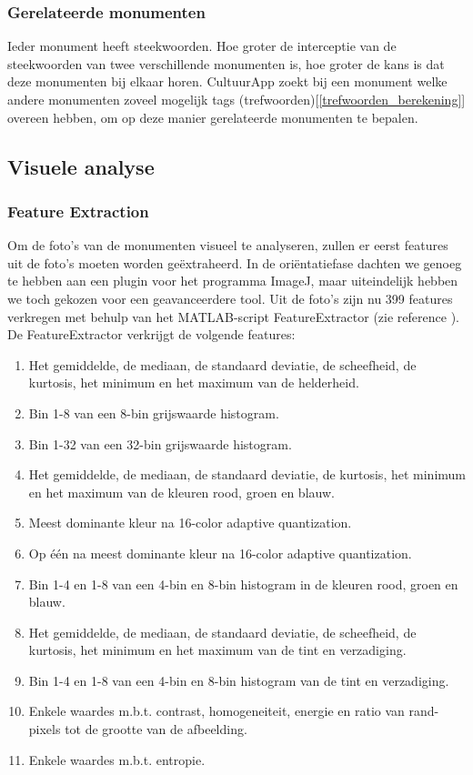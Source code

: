 \documentclass[a4paper,10pt]{article}
\begin{document}
		\subsubsection{Gerelateerde monumenten}
		Ieder monument heeft steekwoorden. Hoe groter de interceptie van de steekwoorden van twee verschillende monumenten is, hoe groter de kans is dat deze monumenten bij elkaar horen. CultuurApp zoekt bij een monument welke andere monumenten zoveel mogelijk tags (trefwoorden)[\ref{trefwoorden_berekening}] overeen hebben, om op deze manier gerelateerde monumenten te bepalen.

	\subsection{Visuele analyse}		
		\subsubsection{Feature Extraction}
		Om de foto's van de monumenten visueel te analyseren, zullen er eerst features uit de foto's moeten worden ge\"extraheerd. In de ori\"entatiefase dachten we genoeg te hebben aan een plugin voor het programma ImageJ, maar uiteindelijk hebben we toch gekozen voor een geavanceerdere tool. Uit de foto's zijn nu 399 features verkregen met behulp van het MATLAB-script FeatureExtractor (zie reference \cite{5}). De FeatureExtractor verkrijgt de volgende features:
		\begin{enumerate}
			\item Het gemiddelde, de mediaan, de standaard deviatie, de scheefheid, de kurtosis, het minimum en het maximum van de helderheid.
			\item Bin 1-8 van een 8-bin grijswaarde histogram.
			\item Bin 1-32 van een 32-bin grijswaarde histogram.
			\item Het gemiddelde, de mediaan, de standaard deviatie, de kurtosis, het minimum en het maximum van de kleuren rood, groen en blauw.
			\item Meest dominante kleur na 16-color adaptive quantization.
			\item Op \'e\'en na meest dominante kleur na 16-color adaptive quantization.
			\item Bin 1-4 en 1-8 van een 4-bin en 8-bin histogram in de kleuren rood, groen en blauw.
			\item Het gemiddelde, de mediaan, de standaard deviatie, de scheefheid, de kurtosis, het minimum en het maximum van de tint en verzadiging.
			\item Bin 1-4 en 1-8 van een 4-bin en 8-bin histogram van de tint en verzadiging.
			\item Enkele waardes m.b.t. contrast, homogeneiteit, energie en ratio van rand-pixels tot de grootte van de afbeelding.
			\item Enkele waardes m.b.t. entropie.
		\end{enumerate}
\end{document}
